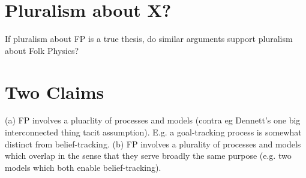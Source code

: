 \documentclass[12pt,\papersize]{extarticle}
\begin{document}
\section{Pluralism about X?}
If pluralism about FP is a true thesis, do similar arguments support pluralism about Folk Physics?

\section{Two Claims}
(a) FP involves a pluarlity of processes and models (contra eg Dennett’s one big interconnected thing tacit assumption). E.g. a goal-tracking process is somewhat distinct from belief-tracking.
(b) FP involves a plurality of processes and models which overlap in the sense that they serve broadly the same purpose (e.g. two models which both enable belief-tracking).


\end{document}
